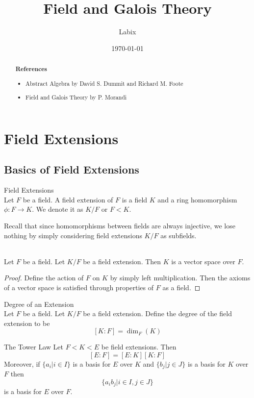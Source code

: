 \documentclass[a4paper]{article}
\title{Field and Galois Theory}
\author{Labix}
\date{\today}
\begin{document}
\maketitle
\begin{abstract}

\textbf{References}
\begin{itemize}
\item Abstract Algebra by David S. Dummit and Richard M. Foote
\item Field and Galois Theory by P. Morandi
\end{itemize}
\end{abstract}
\pagebreak
\tableofcontents

\pagebreak
\section{Field Extensions}
\subsection{Basics of Field Extensions}
\begin{defn}{Field Extensions}{}\\
Let $F$ be a field. A field extension of $F$ is a field $K$ and a ring homomorphism $\phi:F\to K$. We denote it as $K/F$ or $F<K$. 
\end{defn}

Recall that since homomorphisms between fields are always injective, we lose nothing by simply considering field extensions $K/F$ as subfields. 

\begin{lmm}{}{}\\
Let $F$ be a field. Let $K/F$ be a field extension. Then $K$ is a vector space over $F$. 
\begin{proof}
Define the action of $F$ on $K$ by simply left multiplication. Then the axioms of a vector space is satisfied through properties of $F$ as a field. 
\end{proof}
\end{lmm}

\begin{defn}{Degree of an Extension}{}\\
Let $F$ be a field. Let $K/F$ be a field extension. Define the degree of the field extension to be $$[K:F]=\dim_F(K)$$
\end{defn}

\begin{prp}{The Tower Law}{} Let $F<K<E$ be field extensions. Then $$[E:F]=[E:K][K:F]$$ Moreover, if $\{a_i|i\in I\}$ is a basis for $E$ over $K$ and $\{b_j|j\in J\}$ is a basis for $K$ over $F$ then $$\{a_ib_j|i\in I, j\in J\}$$ is a basis for $E$ over $F$. 
\end{prp}
\end{document}
